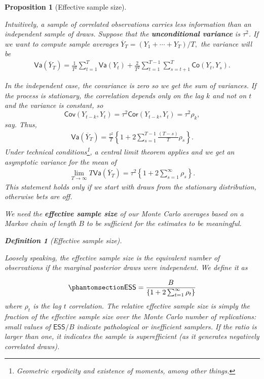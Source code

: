 \documentclass[
  11pt,
  letterpaper,
]{scrbook}
\theoremstyle{definition}
\theoremstyle{plain}
\newtheorem{proposition}{Proposition}[chapter]
\theoremstyle{plain}
\theoremstyle{plain}
\theoremstyle{definition}
\theoremstyle{definition}
\newtheorem{definition}{Definition}[chapter]
\theoremstyle{plain}
\newtheorem{proposition}{Proposition}[chapter]
\theoremstyle{plain}
\theoremstyle{remark}
\begin{document}
\begin{proposition}[Effective sample
size]\protect\hypertarget{prp-variance-clt}{}\label{prp-variance-clt}

Intuitively, a sample of correlated observations carries less
information than an independent sample of draws. Suppose that the
\textbf{unconditional variance} is \(\tau^2\). If we want to compute
sample averages \(\overline{Y}_T=(Y_1+ \cdots + Y_T)/T,\) the variance
will be \begin{align*}
\mathsf{Va}\left(\overline{Y}_T\right) = \frac{1}{T^2}\sum_{t=1}^T \mathsf{Va}(Y_t) + \frac{2}{T^2} \sum_{t=1}^{T-1}\sum_{s = t+1}^T \mathsf{Co}(Y_t, Y_s).
\end{align*}

In the independent case, the covariance is zero so we get the sum of
variances. If the process is stationary, the correlation depends only on
the lag \(k\) and not on \(t\) and the variance is constant, so
\[\mathsf{Cov}(Y_{t-k}, Y_{t})=\tau^2\mathsf{Cor}(Y_{t-k}, Y_{t})=\tau^2\rho_k,\]
say. Thus, \begin{align*}
\mathsf{Va}(\overline{Y}_T) = \frac{\tau^2}{T} \left\{ 1 + 2\sum_{s=1}^{T-1} \frac{(T-s)}{T}\rho_s\right\}.
\end{align*} Under technical conditions\footnote{Geometric ergodicity
  and existence of moments, among other things.}, a central limit
theorem applies and we get an asymptotic variance for the mean of
\begin{align*}
\lim_{T \to \infty} T\mathsf{Va}\left(\overline{Y}_T\right) = \tau^2 \left\{1+2\sum_{s=1}^\infty \rho_s\right\}.
\end{align*} This statement holds only if we start with draws from the
stationary distribution, otherwise bets are off.

We need the \textbf{effective sample size} of our Monte Carlo averages
based on a Markov chain of length \(B\) to be sufficient for the
estimates to be meaningful.

\begin{definition}[Effective sample
size]\protect\hypertarget{def-ess}{}\label{def-ess}

Loosely speaking, the effective sample size is the equivalent number of
observations if the marginal posterior draws were independent. We define
it as

\begin{equation}\protect\phantomsection\label{eq-effective-sample-size}{
\mathsf{ESS} = \frac{B}{\left\{1+2\sum_{t=1}^\infty \rho_t\right\}}
}\end{equation} where \(\rho_t\) is the lag \(t\) correlation. The
relative effective sample size is simply the fraction of the effective
sample size over the Monte Carlo number of replications: small values of
\(\mathsf{ESS}/B\) indicate pathological or inefficient samplers. If the
ratio is larger than one, it indicates the sample is superefficient (as
it generates negatively correlated draws).


\end{definition}
\end{proposition}
\end{document}
